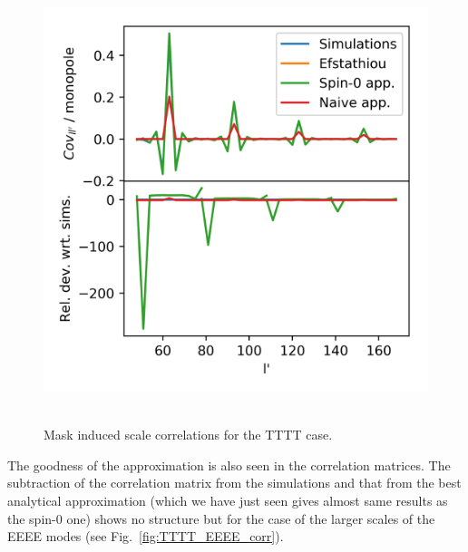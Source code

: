 \documentclass[a4paper,11pt]{article}
\begin{document}
\begin{figure} %
  \centering
  \includegraphics[width=\columnwidth]{./figures/run_sph_ALL_TTTT_rows_cov_matrix.png}~
  \caption{Mask induced scale correlations for the TTTT case.}
  \label{fig:TTTT_rows}
\end{figure}

The goodness of the approximation is also seen in the correlation matrices.
The subtraction of the correlation matrix from the simulations and that from
the best analytical approximation (which we have just seen gives almost same
results as the spin-0 one) shows no structure but for the case of the larger
scales of the EEEE modes (see Fig.~\ref{fig:TTTT_EEEE_corr}).
\end{document}

